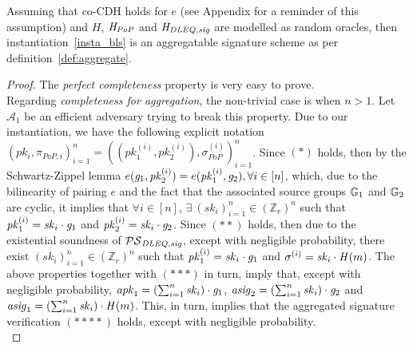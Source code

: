 \begin{theorem} Assuming that co-CDH holds for $e$ (see Appendix for a reminder of this assumption) 
and $H$, $\mathit{H}_{\mathit{PoP}}$ and $\mathit{H}_{\mathit{DLEQ}, \mathit{sig}}$ are modelled as random oracles, then instantiation~\ref{insta_bls} 
is an aggregatable signature scheme as per definition~\ref{def:aggregate}. 
\end{theorem}
\begin{proof} The \emph{perfect completeness} property is very easy to prove. \\ 

\noindent Regarding \emph{completeness for aggregation}, the non-trivial case is when $n>1$. 
Let $\mathcal{A}_1$ be an efficient adversary trying to break this property. Due to our instantiation, 
we have the following explicit notation 
$(\mathit{pk_i}, \pi_{\mathit{PoP},i})_{i=1}^n = ((\mathit{pk_1^{(i)}}, \mathit{pk_2^{(i)}}), \sigma^{(i)}_{\mathit{PoP}})_{i=1}^n$. 
Since $(\ast)$ holds, then by the Schwartz-Zippel lemma 
$e(\mathit{g}_{1}, \mathit{pk}_2^{(i)}) = e(\mathit{pk}_1^{(i)}, \mathit{g}_{2}), \forall i \in [n]$, which, due to the bilinearity of pairing $e$ 
and the fact that the associated source groups $\mathbb{G}_{1}$ and $\mathbb{G}_{2}$ are cyclic, it implies that 
$\forall i \in [n]$, $\exists \ (\mathit{sk}_i)_{i=1}^n \in (\mathbb{Z}_r)^{n}$ such that $\mathit{pk}_1^{(i)} = \mathit{sk}_i \cdot \mathit{g}_{1}$ and 
$\mathit{pk}_2^{(i)} = \mathit{sk}_i \cdot \mathit{g}_{2}$. Since $(\ast\ast)$ holds, then due to the existential soundness of $\mathcal{PS}_{\mathit{DLEQ}, \mathit{sig}}$,  
except with negligible probability, there exist $(\mathit{sk}_i)_{i=1}^n \in (\mathbb{Z}_r)^{n}$ such that 
$\mathit{pk}_1^{(i)} = \mathit{sk}_i \cdot \mathit{g}_{1}$ and $\sigma^{(i)} = \mathit{sk}_i \cdot \mathit{H}(m)$. 
The above properties together with $(\ast\ast\ast)$ in turn, imply that, except with negligible probability, 
$\mathit{apk}_1 = (\sum_{i=1}^n \mathit{sk}_i) \cdot \mathit{g}_{1}$, $\mathit{asig}_2 = (\sum_{i=1}^n \mathit{sk}_i) \cdot \mathit{g}_{2}$ and 
$\mathit{asig}_1 = (\sum_{i=1}^n \mathit{sk}_i) \cdot \mathit{H}(m)$. This, in turn, implies that the aggregated signature verification $(\ast\ast\ast\ast)$ 
holds, except with negligible probability. \\ 


\end{proof}
